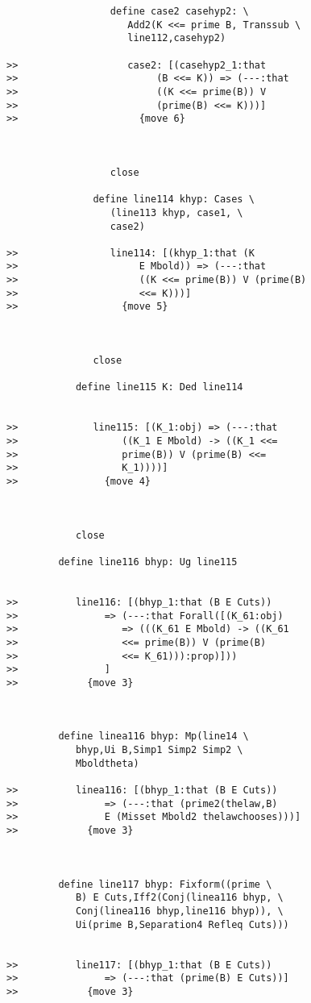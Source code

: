 \documentclass[12pt]{article}
\begin{document}
\begin{verbatim}
                  define case2 casehyp2: \
                     Add2(K <<= prime B, Transsub \
                     line112,casehyp2)

>>                   case2: [(casehyp2_1:that
>>                        (B <<= K)) => (---:that
>>                        ((K <<= prime(B)) V
>>                        (prime(B) <<= K)))]
>>                     {move 6}



                  close

               define line114 khyp: Cases \
                  (line113 khyp, case1, \
                  case2)

>>                line114: [(khyp_1:that (K
>>                     E Mbold)) => (---:that
>>                     ((K <<= prime(B)) V (prime(B)
>>                     <<= K)))]
>>                  {move 5}



               close

            define line115 K: Ded line114


>>             line115: [(K_1:obj) => (---:that
>>                  ((K_1 E Mbold) -> ((K_1 <<=
>>                  prime(B)) V (prime(B) <<=
>>                  K_1))))]
>>               {move 4}



            close

         define line116 bhyp: Ug line115


>>          line116: [(bhyp_1:that (B E Cuts))
>>               => (---:that Forall([(K_61:obj)
>>                  => (((K_61 E Mbold) -> ((K_61
>>                  <<= prime(B)) V (prime(B)
>>                  <<= K_61))):prop)]))
>>               ]
>>            {move 3}



         define linea116 bhyp: Mp(line14 \
            bhyp,Ui B,Simp1 Simp2 Simp2 \
            Mboldtheta)

>>          linea116: [(bhyp_1:that (B E Cuts))
>>               => (---:that (prime2(thelaw,B)
>>               E (Misset Mbold2 thelawchooses)))]
>>            {move 3}



         define line117 bhyp: Fixform((prime \
            B) E Cuts,Iff2(Conj(linea116 bhyp, \
            Conj(linea116 bhyp,line116 bhyp)), \
            Ui(prime B,Separation4 Refleq Cuts)))


>>          line117: [(bhyp_1:that (B E Cuts))
>>               => (---:that (prime(B) E Cuts))]
>>            {move 3}




\end{verbatim}
\end{document}
